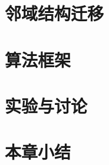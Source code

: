 \section{邻域结构迁移}
\label{sec:NST:邻域结构迁移}

\section{算法框架}
\label{sec:NST:算法框架}

\section{实验与讨论}
\label{sec:NST:实验与讨论}

\section{本章小结}
\label{sec:NST:本章小结}